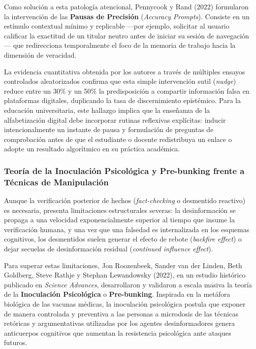 Como solución a esta patología atencional, Pennycook y Rand (2022) formularon la intervención de las \textbf{Pausas de Precisión} (\textit{Accuracy Prompts}). Consiste en un estímulo contextual mínimo y replicable ---por ejemplo, solicitar al usuario calificar la exactitud de un titular neutro antes de iniciar su sesión de navegación--- que redirecciona temporalmente el foco de la memoria de trabajo hacia la dimensión de veracidad. 

La evidencia cuantitativa obtenida por los autores a través de múltiples ensayos controlados aleatorizados confirma que esta simple intervención sutil (\textit{nudge}) reduce entre un 30\% y un 50\% la predisposición a compartir información falsa en plataformas digitales, duplicando la tasa de discernimiento epistémico. Para la educación universitaria, este hallazgo implica que la enseñanza de la alfabetización digital debe incorporar rutinas reflexivas explícitas: inducir intencionalmente un instante de pausa y formulación de preguntas de comprobación antes de que el estudiante o docente redistribuya un enlace o adopte un resultado algorítmico en su práctica académica.

\subsubsection{Teoría de la Inoculación Psicológica y Pre-bunking frente a Técnicas de Manipulación}

Aunque la verificación posterior de hechos (\textit{fact-checking} o desmentido reactivo) es necesaria, presenta limitaciones estructurales severas: la desinformación se propaga a una velocidad exponencialmente superior al tiempo que insume la verificación humana, y una vez que una falsedad es internalizada en los esquemas cognitivos, los desmentidos suelen generar el efecto de rebote (\textit{backfire effect}) o dejar secuelas de desinformación residual (\textit{continued influence effect}).

Para superar estas limitaciones, Jon Roozenbeek, Sander van der Linden, Beth Goldberg, Steve Rathje y Stephan Lewandowsky (2022), en un estudio histórico publicado en \textit{Science Advances}, desarrollaron y validaron a escala masiva la teoría de la \textbf{Inoculación Psicológica} o \textbf{Pre-bunking}. Inspirada en la metáfora biológica de las vacunas médicas, la inoculación psicológica postula que exponer de manera controlada y preventiva a las personas a microdosis de las técnicas retóricas y argumentativas utilizadas por los agentes desinformadores genera anticuerpos cognitivos que aumentan la resistencia psicológica ante ataques futuros.

